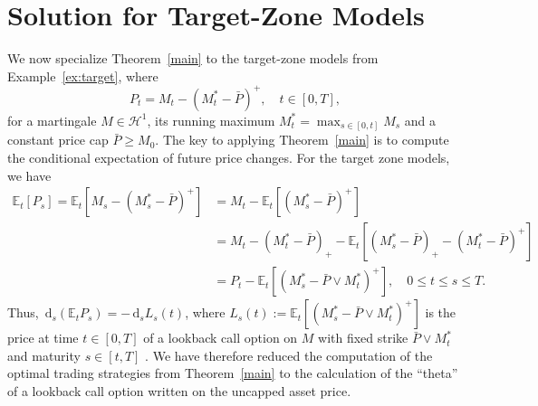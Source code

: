 \documentclass[11pt]{article}
\theoremstyle{definition}
\theoremstyle{remark}
\newtheorem{rem}[thm]{Remark}
\newcommand{\E}{\mathbb{E}} %
\newcommand{\de}{\,\mathrm{d}}
\begin{document}
\section{Solution for Target-Zone Models}\label{s:cap}

We now specialize Theorem~\ref{main} to the target-zone models from Example~\ref{ex:target}, where
$$
P_t=M_t -(M^*_t-\bar{P})^+, \quad t \in [0,T],
$$
for a martingale $M\in\mathcal{H}^1$, its running maximum $M^*_t=\max_{s \in [0,t]}M_s$ and a constant price cap $\bar{P} \geq M_0$. The key to applying Theorem~\ref{main} is to compute the conditional expectation of future price changes. For the target zone models, we have
\begin{align*}
\E_t[P_s] = \E_t\left[M_s-(M^*_s-\bar{P})^+\right] &= M_t-\E_t\left[(M^*_s-\bar{P})^+\right]\\
& =M_t-(M^*_t-\bar{P})_+ - \E_t\left[(M^*_s-\bar{P})_+ - (M^*_t-\bar{P})^+\right]\\
&=P_t - \E_t\left[(M^*_s-\bar{P}\vee M^*_t)^+\right], \quad 0 \leq t \leq s \leq T.
\end{align*}
Thus, $\de_s(\E_t P_s) = -\de_s L_s(t)$, where $L_s(t):=\E_t[(M^*_s-\bar{P}\vee M^*_t)^+]$ is the price at time $t \in [0,T]$ of a lookback call option on $M$ with fixed strike $\bar{P}\vee M^*_t$ and maturity $s \in [t,T]$ . We have therefore reduced the computation of the optimal trading strategies from Theorem~\ref{main} to the calculation of the ``theta'' of a lookback call option written on the uncapped asset price.

\end{document}
